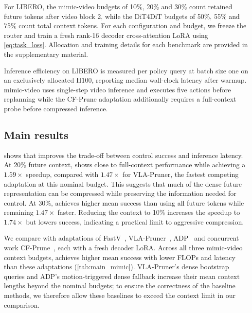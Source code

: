 For LIBERO, the mimic-video budgets of 10\%, 20\% and 30\% count retained future tokens after video block 2, while the DiT4DiT budgets of 50\%, 55\% and 75\% count total context tokens.
For each configuration and budget, we freeze the router and train a fresh rank-16 decoder cross-attention LoRA using \cref{eq:task_loss}.
Allocation and training details for each benchmark are provided in the supplementary material.



Inference efficiency on LIBERO is measured per policy query at batch size one on an exclusively allocated H100, reporting median wall-clock latency after warmup. mimic-video uses single-step video inference and executes five actions before replanning while the CF-Prune adaptation additionally requires a full-context probe before compressed inference.

\subsection{Main results}
\label{sec:exp_main}



 shows that \method improves the trade-off between control success and inference latency.
At 20\% future context, \method shows close to full-context performance while achieving a $1.59\times$ speedup, compared with $1.47\times$ for VLA-Pruner, the fastest competing adaptation at this nominal budget.
This suggests that much of the dense future representation can be compressed while preserving the information needed for control.
At 30\%, \method achieves higher mean success than using all future tokens while remaining $1.47\times$ faster.
Reducing the context to 10\% increases the speedup to $1.74\times$ but lowers success, indicating a practical limit to aggressive compression.


We compare \method with adaptations of FastV~\cite{chen2024fastv}, VLA-Pruner~\cite{liu2025vlapruner}, ADP~\cite{pei2026adp} and concurrent work CF-Prune~\cite{kim2026cfprune}, each with a fresh decoder LoRA.
Across all three mimic-video context budgets, \method achieves higher mean success with lower FLOPs and latency than these adaptations (\cref{tab:main_mimic}).
VLA-Pruner’s dense bootstrap queries and ADP’s motion-triggered dense fallback increase their mean context lengths beyond the nominal budgets; to ensure the correctness of the baseline methods, we therefore allow these baselines to exceed the context limit in our comparison.


